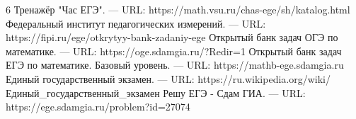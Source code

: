\begin{thebibliography}{6}
	 Тренажёр "Час ЕГЭ". — URL: https://math.vsu.ru/chas-ege/sh/katalog.html
	Федеральный институт педагогических измерений. — URL:  https://fipi.ru/ege/otkrytyy-bank-zadaniy-ege
	Открытый банк задач ОГЭ по математике. — URL:  https://oge.sdamgia.ru/?Redir=1
	Открытый банк задач ЕГЭ по математике. Базовый уровень. — URL:  https://mathb-ege.sdamgia.ru
	 Единый государственный экзамен. — URL:  https://ru.wikipedia.org/wiki/Единый\_государственный\_экзамен
	Решу ЕГЭ - Сдам ГИА. — URL: https://ege.sdamgia.ru/problem?id=27074
\end{thebibliography}